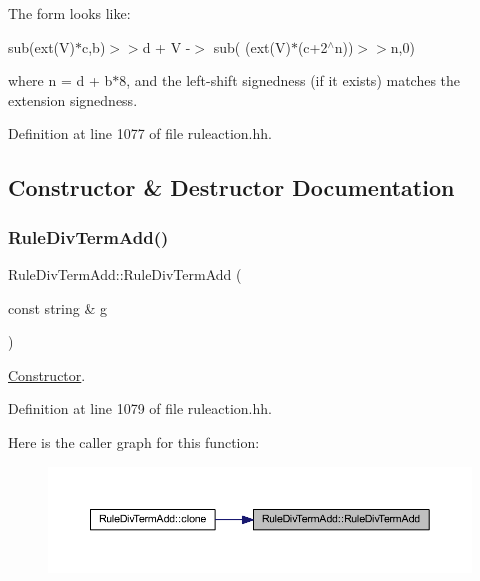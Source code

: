 The form looks like\+:
\begin{DoxyItemize}
\item {\ttfamily sub(ext(\+V)$\ast$c,b)$>$$>$d + V -\/$>$ sub( (ext(\+V)$\ast$(c+2$^\wedge$n))$>$$>$n,0)}
\end{DoxyItemize}

where n = d + b$\ast$8, and the left-\/shift signedness (if it exists) matches the extension signedness. 

Definition at line 1077 of file ruleaction.\+hh.



\subsection{Constructor \& Destructor Documentation}
\mbox{\label{class_rule_div_term_add_aa384aed95bb11b4a2985db1334ed7faa}} 
\subsubsection{\texorpdfstring{RuleDivTermAdd()}{RuleDivTermAdd()}}
{\footnotesize\ttfamily Rule\+Div\+Term\+Add\+::\+Rule\+Div\+Term\+Add (\begin{DoxyParamCaption}\item[{const string \&}]{g }\end{DoxyParamCaption})\hspace{0.3cm}{\ttfamily [inline]}}



\mbox{\hyperlink{class_constructor}{Constructor}}. 



Definition at line 1079 of file ruleaction.\+hh.

Here is the caller graph for this function\+:
\nopagebreak
\begin{figure}[H]
\begin{center}
\leavevmode
\includegraphics[width=350pt]{class_rule_div_term_add_aa384aed95bb11b4a2985db1334ed7faa_icgraph}
\end{center}
\end{figure}


